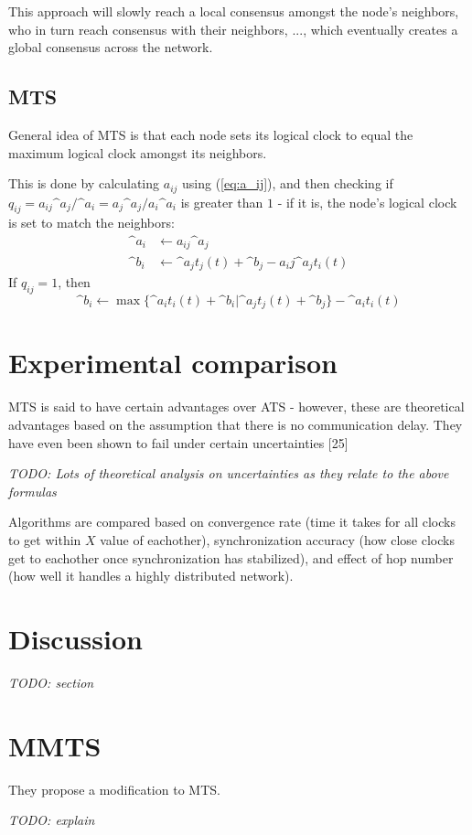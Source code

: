 \documentclass{article}
\begin{document}
This approach will slowly reach a local consensus amongst the node's neighbors, who in turn reach consensus with their neighbors, $...$, which eventually creates a global consensus across the network.

\subsection{MTS}

General idea of MTS is that each node sets its logical clock to equal the maximum logical clock amongst its neighbors.

This is done by calculating $a_{ij}$ using (\ref{eq:a_ij}), and then checking if $q_{ij} = a_{ij} \^{a}_j/\^{a}_i = a_j\^{a}_j / a_i\^{a}_i$ is greater than $1$ - if it is, the node's logical clock is set to match the neighbors:
\begin{align*}
    \^{a}_i &\leftarrow a_{ij}\^{a}_j \\
    \^{b}_i &\leftarrow \^{a}_j t_j(t) + \^{b}_j - a_ij \^a_j t_i(t)
\end{align*}
If $q_{ij} = 1$, then
$$ \^b_i \leftarrow \max\{\^a_i t_i(t) + \^b_i | \^a_j t_j(t) + \^b_j\} - \^a_i t_i(t) $$

\section{Experimental comparison}

MTS is said to have certain advantages over ATS - however, these are theoretical advantages based on the assumption that there is no communication delay. They have even been shown to fail under certain uncertainties [25]

\textit{TODO: Lots of theoretical analysis on uncertainties as they relate to the above formulas}

Algorithms are compared based on convergence rate (time it takes for all clocks to get within $X$ value of eachother), synchronization accuracy (how close clocks get to eachother once synchronization has stabilized), and effect of hop number (how well it handles a highly distributed network).

\section{Discussion}

\textit{TODO: section}

\section{MMTS}

They propose a modification to MTS.

\textit{TODO: explain}
\end{document}
